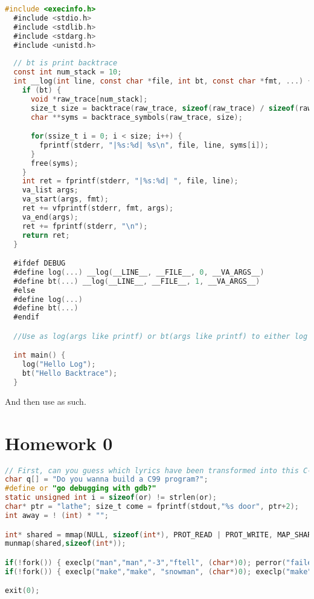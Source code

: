 \begin{lstlisting}[language=C]
  #include <execinfo.h>
  #include <stdio.h>
  #include <stdlib.h>
  #include <stdarg.h>
  #include <unistd.h>
  
  // bt is print backtrace
  const int num_stack = 10;
  int __log(int line, const char *file, int bt, const char *fmt, ...) {
    if (bt) {
      void *raw_trace[num_stack];
      size_t size = backtrace(raw_trace, sizeof(raw_trace) / sizeof(raw_trace[0]));
      char **syms = backtrace_symbols(raw_trace, size);

      for(ssize_t i = 0; i < size; i++) {
        fprintf(stderr, "|%s:%d| %s\n", file, line, syms[i]);
      }
      free(syms); 
    }
    int ret = fprintf(stderr, "|%s:%d| ", file, line);
    va_list args;
    va_start(args, fmt); 
    ret += vfprintf(stderr, fmt, args);
    va_end(args);
    ret += fprintf(stderr, "\n");
    return ret;
  }

  #ifdef DEBUG
  #define log(...) __log(__LINE__, __FILE__, 0, __VA_ARGS__)
  #define bt(...) __log(__LINE__, __FILE__, 1, __VA_ARGS__)
  #else
  #define log(...)
  #define bt(...)
  #endif

  //Use as log(args like printf) or bt(args like printf) to either log or get backtrace

  int main() {
    log("Hello Log");
    bt("Hello Backtrace");
  }
\end{lstlisting}

And then use as such.

\newpage

\section{Homework 0} 

\begin{lstlisting}[language=C]
// First, can you guess which lyrics have been transformed into this C-like system code?
char q[] = "Do you wanna build a C99 program?";
#define or "go debugging with gdb?"
static unsigned int i = sizeof(or) != strlen(or);
char* ptr = "lathe"; size_t come = fprintf(stdout,"%s door", ptr+2);
int away = ! (int) * "";

int* shared = mmap(NULL, sizeof(int*), PROT_READ | PROT_WRITE, MAP_SHARED | MAP_ANONYMOUS, -1, 0);
munmap(shared,sizeof(int*));

if(!fork()) { execlp("man","man","-3","ftell", (char*)0); perror("failed"); }
if(!fork()) { execlp("make","make", "snowman", (char*)0); execlp("make","make", (char*)0)); }

exit(0);
\end{lstlisting}

